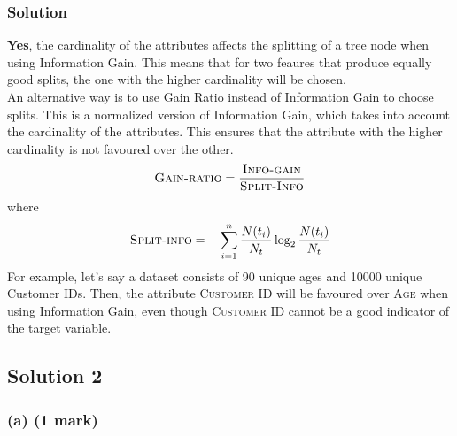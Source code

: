 \documentclass[12pt]{article}
\begin{document}
    \subsubsection*{Solution}
    \textbf{Yes}, the cardinality of the attributes affects the splitting of
    a tree node when using Information Gain. This means that for two feaures
    that produce equally good splits, the one with the higher cardinality will
    be chosen. \\
    An alternative way is to use Gain Ratio instead of Information Gain to choose
    splits. This is a normalized version of Information Gain, which takes into
    account the cardinality of the attributes. This ensures that the attribute
    with the higher cardinality is not favoured over the other.
    $$\textsc{Gain-ratio} = \frac{\textsc{Info-gain}}{\textsc{Split-Info}}$$
    where
    $$\textsc{Split-info} = -\sum_{i=1}^{n} \frac{N(t_{i})}{N_{t}} \log_{2}{\frac{N(t_{i})}{N_{t}}}$$
    For example, let's say a dataset consists of 90 unique ages and 10000
    unique Customer IDs. Then, the attribute \textsc{Customer ID} will be
    favoured over \textsc{Age} when using Information Gain, even though
    \textsc{Customer ID} cannot be a good indicator of the target variable.

    \subsection*{Solution 2}
    \subsubsection*{(a) (1 mark)}
\end{document}
